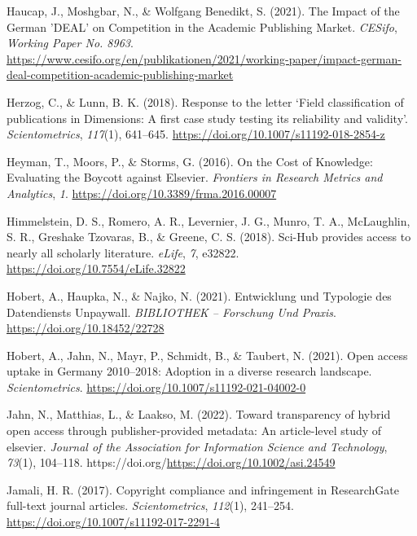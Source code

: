 \documentclass[
]{article}
\newlength{\cslhangindent}
\newlength{\cslentryspacingunit} %
\newenvironment{CSLReferences}[2] %
 {%
  \setlength{\parindent}{0pt}
  \ifodd #1
  \let\oldpar\par
  \def\par{\hangindent=\cslhangindent\oldpar}
  \fi
  \setlength{\parskip}{#2\cslentryspacingunit}
 }%
 {}
\begin{document}
\begin{CSLReferences}{1}{0}
\leavevmode{}%
Haucap, J., Moshgbar, N., \& Wolfgang Benedikt, S. (2021). The {Impact} of the {German} '{DEAL}' on {Competition} in the {Academic} {Publishing} {Market}. \emph{CESifo}, \emph{Working Paper No. 8963}. \url{https://www.cesifo.org/en/publikationen/2021/working-paper/impact-german-deal-competition-academic-publishing-market}

\leavevmode{}%
Herzog, C., \& Lunn, B. K. (2018). Response to the letter {`{Field} classification of publications in {Dimensions}: A first case study testing its reliability and validity'}. \emph{Scientometrics}, \emph{117}(1), 641--645. \url{https://doi.org/10.1007/s11192-018-2854-z}

\leavevmode{}%
Heyman, T., Moors, P., \& Storms, G. (2016). On the {Cost} of {Knowledge}: {Evaluating} the {Boycott} against {Elsevier}. \emph{Frontiers in Research Metrics and Analytics}, \emph{1}. \url{https://doi.org/10.3389/frma.2016.00007}

\leavevmode{}%
Himmelstein, D. S., Romero, A. R., Levernier, J. G., Munro, T. A., McLaughlin, S. R., Greshake Tzovaras, B., \& Greene, C. S. (2018). Sci-{Hub} provides access to nearly all scholarly literature. \emph{eLife}, \emph{7}, e32822. \url{https://doi.org/10.7554/eLife.32822}

\leavevmode{}%
Hobert, A., Haupka, N., \& Najko, N. (2021). Entwicklung und {Typologie} des {Datendiensts} {Unpaywall}. \emph{BIBLIOTHEK -- Forschung Und Praxis}. \url{https://doi.org/10.18452/22728}

\leavevmode{}%
Hobert, A., Jahn, N., Mayr, P., Schmidt, B., \& Taubert, N. (2021). Open access uptake in {Germany} 2010--2018: Adoption in a diverse research landscape. \emph{Scientometrics}. \url{https://doi.org/10.1007/s11192-021-04002-0}

\leavevmode{}%
Jahn, N., Matthias, L., \& Laakso, M. (2022). Toward transparency of hybrid open access through publisher-provided metadata: An article-level study of elsevier. \emph{Journal of the Association for Information Science and Technology}, \emph{73}(1), 104--118. https://doi.org/\url{https://doi.org/10.1002/asi.24549}

\leavevmode{}%
Jamali, H. R. (2017). Copyright compliance and infringement in {ResearchGate} full-text journal articles. \emph{Scientometrics}, \emph{112}(1), 241--254. \url{https://doi.org/10.1007/s11192-017-2291-4}


\end{CSLReferences}
\end{document}
